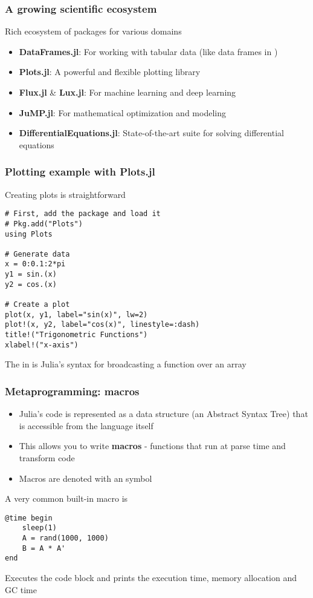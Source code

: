 \documentclass[aspectratio=169]{beamer}\usepackage[]{graphicx}\usepackage[]{xcolor}
\begin{document}
\begin{frame}
  \frametitle{A growing scientific ecosystem}
  Rich ecosystem of packages for various domains
  \vfill
  \begin{itemize}
    \item \textbf{DataFrames.jl}: For working with tabular data (like data frames in )
    \vfill
    \item \textbf{Plots.jl}: A powerful and flexible plotting library
    \vfill
    \item \textbf{Flux.jl} \& \textbf{Lux.jl}: For machine learning and deep learning
    \vfill
    \item \textbf{JuMP.jl}: For mathematical optimization and modeling
    \vfill
    \item \textbf{DifferentialEquations.jl}: State-of-the-art suite for solving differential equations
  \end{itemize}
\end{frame}

\begin{frame}[fragile]
  \frametitle{Plotting example with Plots.jl}
  Creating plots is straightforward
  \begin{lstlisting}
# First, add the package and load it
# Pkg.add("Plots")
using Plots

# Generate data
x = 0:0.1:2*pi
y1 = sin.(x)
y2 = cos.(x)

# Create a plot
plot(x, y1, label="sin(x)", lw=2)
plot!(x, y2, label="cos(x)", linestyle=:dash)
title!("Trigonometric Functions")
xlabel!("x-axis")\end{lstlisting}
The  in  is Julia's syntax for broadcasting a function over an array
\end{frame}

\begin{frame}[fragile]
  \frametitle{Metaprogramming: macros}
  \begin{itemize}
    \item Julia's code is represented as a data structure (an Abstract Syntax Tree) that is accessible from the language itself
    \item This allows you to write \textbf{macros} - functions that run at parse time and transform code
    \item Macros are denoted with an  symbol
  \end{itemize}
  \vfill
  A very common built-in macro is 
  \begin{lstlisting}
@time begin
    sleep(1)
    A = rand(1000, 1000)
    B = A * A'
end\end{lstlisting}
Executes the code block and prints the execution time, memory allocation and GC time
\end{frame}
\end{document}

